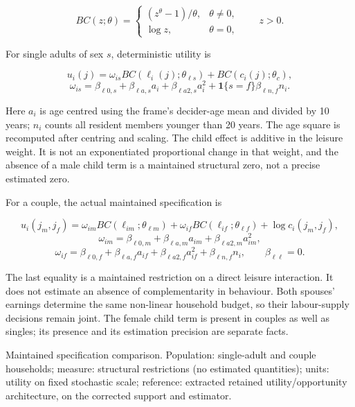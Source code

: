 \documentclass[11pt,a4paper]{article}
\begin{document}
\[BC(z;\theta)=\begin{cases}(z^\theta-1)/\theta,&\theta\ne0,\\\log z,&\theta=0,\end{cases}\qquad z>0.\]

For single adults of sex \(s\), deterministic utility is

\[u_i(j)=\omega_{is}BC(\ell_i(j);\theta_{\ell s})+BC(c_i(j);\theta_c),\] \[\omega_{is}=\beta_{\ell0,s}+\beta_{\ell a,s}a_i+\beta_{\ell a2,s}a_i^2+
\mathbf1\{s=f\}\beta_{\ell n,f}n_i.\]

Here \(a_i\) is age centred using the frame's decider-age mean and divided by 10 years; \(n_i\) counts all resident members younger than 20 years. The age square is recomputed after centring and scaling. The child effect is additive in the leisure weight. It is not an exponentiated proportional change in that weight, and the absence of a male child term is a maintained structural zero, not a precise estimated zero.

For a couple, the actual maintained specification is

\[u_i(j_m,j_f)=\omega_{im}BC(\ell_{im};\theta_{\ell m})+
\omega_{if}BC(\ell_{if};\theta_{\ell f})+\log c_i(j_m,j_f),\] \[\omega_{im}=\beta_{\ell0,m}+\beta_{\ell a,m}a_{im}+\beta_{\ell a2,m}a_{im}^2,\] \[\omega_{if}=\beta_{\ell0,f}+\beta_{\ell a,f}a_{if}+\beta_{\ell a2,f}a_{if}^2+
\beta_{\ell n,f}n_i,\qquad \beta_{\ell\ell}=0.\]

The last equality is a maintained restriction on a direct leisure interaction. It does not estimate an absence of complementarity in behaviour. Both spouses' earnings determine the same non-linear household budget, so their labour-supply decisions remain joint. The female child term is present in couples as well as singles; its presence and its estimation precision are separate facts.

Maintained specification comparison. Population: single-adult and couple households; measure: structural restrictions (no estimated quantities); units: utility on fixed stochastic scale; reference: extracted retained utility/opportunity architecture, on the corrected support and estimator.
\end{document}
